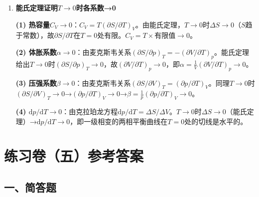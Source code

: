 \documentclass[12pt,a4paper,fontset=mac]{ctexart}
\newcommand{\dd}{\mathrm{d}}
\newcommand{\đ}{\mathrm{đ}}
\begin{document}
\begin{enumerate}
$\varepsilon=cp\propto L^{-1}\propto V^{-1/3}$，故$\frac{\partial\varepsilon_l}{\partial V}=-\frac{1}{3}\frac{\varepsilon_l}{V}$。

代入压强公式：
\[p = -\sum_l a_l\frac{\partial\varepsilon_l}{\partial V} = -\sum_l a_l\left(-\frac{1}{3}\frac{\varepsilon_l}{V}\right) = \frac{1}{3V}\sum_l a_l\varepsilon_l = \frac{U}{3V}.\]

\textbf{与分布无关}：该推导仅用到$\varepsilon\propto V^{-1/3}$（极端相对论粒子的标度关系），不依赖于$a_l$的具体分布形式，因此结论对玻尔兹曼分布、玻色分布和费米分布均成立。

\textbf{与非相对论对比}：非相对论$\varepsilon\propto V^{-2/3}$→$p=2U/3V$；极端相对论$\varepsilon\propto V^{-1/3}$→$p=U/3V$。光子气体（$\varepsilon=cp$，$m=0$）的辐射压强$p=u/3$（$u=U/V$），正是这一结果的体现。

\item \textbf{能氏定理证明$T\to0$时各系数→0}

\textbf{(1) 热容量$C_V\to0$}：$C_V=T(\partial S/\partial T)_V$。由能氏定理，$T\to0$时$\Delta S\to0$（$S$趋于常数），故$\partial S/\partial T$在$T=0$处有限。$C_V = T\times\text{有限值}\to0$。

\textbf{(2) 体胀系数$\alpha\to0$}：由麦克斯韦关系$(\partial S/\partial p)_T=-(\partial V/\partial T)_p$。能氏定理给出$T\to0$时$(\partial S/\partial p)_T\to0$，故$(\partial V/\partial T)_p\to0$，即$\alpha=\frac{1}{V}(\partial V/\partial T)_p\to0$。

\textbf{(3) 压强系数$\beta\to0$}：由麦克斯韦关系$(\partial S/\partial V)_T=(\partial p/\partial T)_V$。同理$T\to0$时$(\partial S/\partial V)_T\to0$→$(\partial p/\partial T)_V\to0$→$\beta=\frac{1}{p}(\partial p/\partial T)_V\to0$。

\textbf{(4) $\dd p/\dd T\to0$}：由克拉珀龙方程$\dd p/\dd T=\Delta S/\Delta V$。$T\to0$时$\Delta S\to0$（能氏定理）→$\dd p/\dd T\to0$，即一级相变的两相平衡曲线在$T=0$处的切线是水平的。

\end{enumerate}

\newpage

\section*{练习卷（五）参考答案}

\subsection*{一、简答题}
\end{document}
